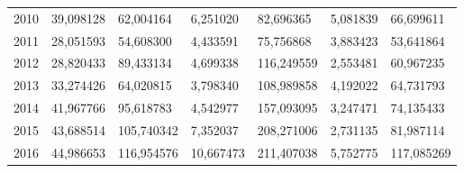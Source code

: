 \begin{table}
\begin{tabular}{p{1cm}p{2cm}p{2cm}p{2cm}p{2cm}p{2cm}p{2cm}}
 2010 &                                    39,098128 &         62,004164 &                       6,251020 &  82,696365 &                       5,081839 &         66,699611 \\
 2011 &                                    28,051593 &         54,608300 &                       4,433591 &  75,756868 &                       3,883423 &         53,641864 \\
 2012 &                                    28,820433 &         89,433134 &                       4,699338 & 116,249559 &                       2,553481 &         60,967235 \\
 2013 &                                    33,274426 &         64,020815 &                       3,798340 & 108,989858 &                       4,192022 &         64,731793 \\
 2014 &                                    41,967766 &         95,618783 &                       4,542977 & 157,093095 &                       3,247471 &         74,135433 \\
 2015 &                                    43,688514 &        105,740342 &                       7,352037 & 208,271006 &                       2,731135 &         81,987114 \\
 2016 &                                    44,986653 &        116,954576 &                      10,667473 & 211,407038 &                       5,752775 &        117,085269 \\
\bottomrule
\end{tabular}
\end{table}
